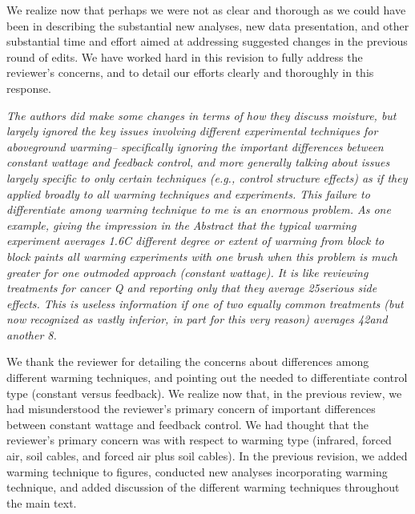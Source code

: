 \documentclass[11pt,a4paper]{letter}
\begin{document}
\begin{letter}{}
\par We realize now that perhaps we were not as clear and thorough as we could have been in describing the substantial new analyses, new data presentation, and other substantial time and effort aimed at addressing suggested changes in the previous round of edits. We have worked hard in this revision to fully address the reviewer's concerns, and to detail our efforts clearly and thoroughly in this response. 

\par \emph{The authors did make some changes in terms of how they discuss moisture, but largely ignored the key issues involving different experimental techniques for aboveground warming-- specifically ignoring the important differences between constant wattage and feedback control, and more generally talking about issues largely specific to only certain techniques (e.g., control structure effects) as if they applied broadly to all warming techniques and experiments. This failure to differentiate among warming technique to me is an enormous problem. As one example, giving the impression in the Abstract that the typical warming experiment averages 1.6C different degree or extent of warming from block to block paints all warming experiments with one brush when this problem is much greater for one outmoded approach (constant
wattage). It is like reviewing treatments for cancer Q and reporting only that they average 25\percent serious side effects. This is useless information if one of two equally common treatments (but now recognized as vastly inferior, in part for this very reason) averages 42\percent and another 8\percent.}
\par We thank the reviewer for detailing the concerns about differences among different warming techniques, and pointing out the needed to differentiate control type (constant versus feedback). We realize now that, in the previous review, we had misunderstood the reviewer's primary concern of important differences between constant wattage and feedback control. We had thought that the reviewer's primary concern was with respect to warming type (infrared, forced air, soil cables, and forced air plus soil cables). In the previous revision, we added warming technique to figures, conducted new analyses incorporating warming technique, and added discussion of the different warming techniques throughout the main text.  %


\end{letter}
\end{document}
